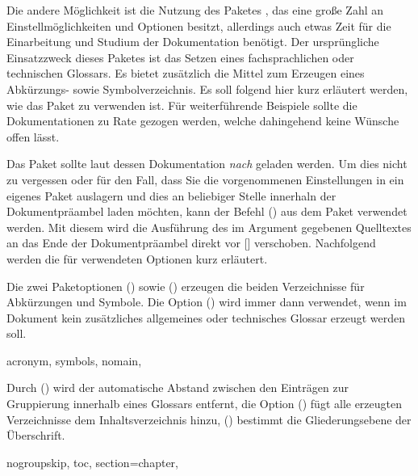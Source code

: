 \documentclass[%
  english,ngerman,%
  cdgeometry=no,DIV=12,%
  cd=false,cdfont=false,cdtitle=true,%
  headings=normal,%
  automark,%
  listof=toc,%
]{tudscrartcl}
\begin{document}
Die andere Möglichkeit ist die Nutzung des Paketes , das 
eine große Zahl an Einstellmöglichkeiten und Optionen besitzt, allerdings auch 
etwas Zeit für die Einarbeitung und Studium der Dokumentation benötigt. Der 
ursprüngliche Einsatzzweck dieses Paketes ist das Setzen eines fachsprachlichen 
oder technischen Glossars. Es bietet zusätzlich die Mittel zum Erzeugen eines 
Abkürzungs- sowie Symbolverzeichnis. Es soll folgend hier kurz erläutert 
werden, wie das Paket zu verwenden ist. Für weiterführende Beispiele sollte 
die Dokumentationen zu Rate gezogen werden, welche dahingehend keine Wünsche 
offen lässt. 

Das Paket  sollte laut dessen Dokumentation \emph{nach} 
 geladen werden. Um dies nicht zu vergessen oder für den 
Fall, dass Sie die vorgenommenen Einstellungen in ein eigenes Paket auslagern 
und dies an beliebiger Stelle innerhaln der Dokumentpräambel laden möchten, 
kann der Befehl () aus dem Paket 
 verwendet werden. Mit diesem wird die Ausführung des im 
Argument gegebenen Quelltextes an das Ende der Dokumentpräambel direkt vor 
[] verschoben. Nachfolgend werden die für 
 verwendeten Optionen kurz erläutert.
%
\begin{Preamble+}
\AtEndPreamble{%
\end{Preamble+}
\begin{Preamble}
\usepackage[%
\end{Preamble}
%
Die zwei Paketoptionen () sowie 
() erzeugen die beiden Verzeichnisse für 
Abkürzungen und Symbole. Die Option () wird 
immer dann verwendet, wenn im Dokument kein zusätzliches allgemeines oder 
technisches Glossar erzeugt werden soll.
%
\begin{Preamble}
  acronym,%
  symbols,%
  nomain,%
\end{Preamble}
%
Durch () wird der automatische Abstand 
zwischen den Einträgen zur Gruppierung innerhalb eines Glossars entfernt, die 
Option () fügt alle erzeugten Verzeichnisse 
dem Inhaltsverzeichnis hinzu, () bestimmt 
die Gliederungsebene der Überschrift.
%
\begin{Preamble}
  nogroupskip,%
  toc,%
  section=chapter,%
\end{Preamble}
\end{document}
